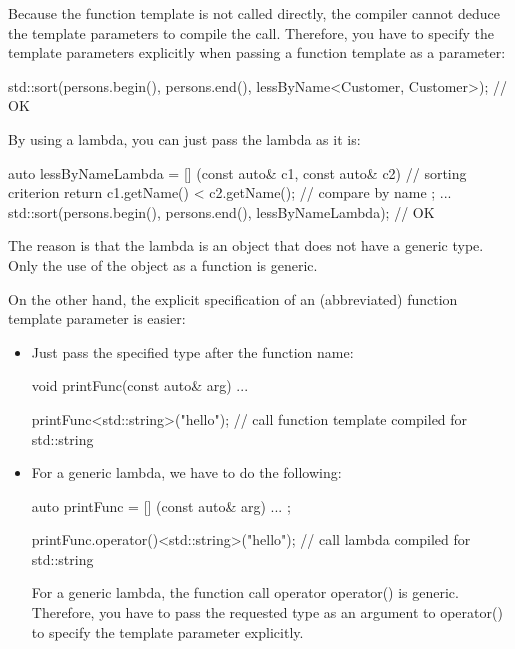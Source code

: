 Because the function template is not called directly, the compiler cannot deduce the template parameters to compile the call. Therefore, you have to specify the template parameters explicitly when passing a function template as a parameter:

\begin{cpp}
std::sort(persons.begin(), persons.end(),
		  lessByName<Customer, Customer>); // OK
\end{cpp}

By using a lambda, you can just pass the lambda as it is:

\begin{cpp}
auto lessByNameLambda = [] (const auto& c1, const auto& c2) { // sorting criterion
							return c1.getName() < c2.getName(); // compare by name
						};
...
std::sort(persons.begin(), persons.end(),
		  lessByNameLambda); // OK
\end{cpp}

The reason is that the lambda is an object that does not have a generic type. Only the use of the object as a function is generic.

On the other hand, the explicit specification of an (abbreviated) function template parameter is easier:

\begin{itemize}
\item
Just pass the specified type after the function name:

\begin{cpp}
void printFunc(const auto& arg) {
	...
}

printFunc<std::string>("hello"); // call function template compiled for std::string
\end{cpp}

\item
For a generic lambda, we have to do the following:

\begin{cpp}
auto printFunc = [] (const auto& arg) {
	...
};

printFunc.operator()<std::string>("hello"); // call lambda compiled for std::string
\end{cpp}

For a generic lambda, the function call operator operator() is generic. Therefore, you have to pass the requested type as an argument to operator() to specify the template parameter explicitly.
\end{itemize}






